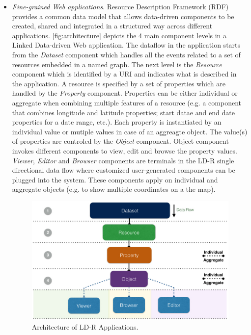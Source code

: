 \documentclass{acm_proc_article-sp}
\begin{document}
\begin{itemize}

\item \emph{Fine-grained Web applications}.
Resource Description Framework (RDF) provides a common data model that allows data-driven components to be created, shared and integrated in a structured way across different applications. \autoref{fig:architecture} depicts the 4 main component levels in a Linked Data-driven Web application.
The dataflow in the application starts from the \emph{Dataset} component which handles all the events related to a set of resources embedded in a named graph.
The next level is the \emph{Resource} component which is identified by a URI and indicates what is described in the application.
A resource is specified by a set of properties which are handled by the \emph{Property} component. Properties can be either individual or aggregate when combining multiple features of a resource (e.g. a component that combines longitude and latitude properties; start datae and end date properties for a date range, etc.).
Each property is instantiated by an individual value or mutiple values in case of an aggreagte object. 
The value(s) of properties are controled by the \emph{Object} component.
Object component invokes different components to view, edit and browse the property values.
\emph{Viewer}, \emph{Editor} and \emph{Browser} components are terminals in the LD-R single directional data flow where customized user-generated components can be plugged into the system.
These components apply on individual and aggregate objects (e.g. to show multiple coordinates on a the map).

\begin{figure}[tb]
  \includegraphics[width=.9\linewidth]{images/architecture.jpg}
  \caption{Architecture of LD-R Applications.}
  \label{fig:architecture}
\end{figure}


\end{itemize}
\end{document}

